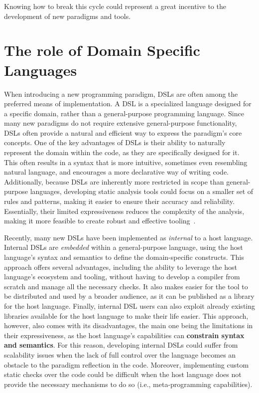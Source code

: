 \documentclass[12pt,a4paper,openright,twoside]{book}
\begin{document}
Knowing how to break this cycle could represent a great incentive to the
development of new paradigms and tools.

\section{The role of Domain Specific Languages} \label{sec:dsls}

When introducing a new programming paradigm, \acp{DSL} are often among the
preferred means of implementation. A \ac{DSL} is a specialized language designed
for a specific domain, rather than a general-purpose programming language. Since
many new paradigms do not require extensive general-purpose functionality,
\acp{DSL} often provide a natural and efficient way to express the paradigm’s
core concepts.
%
One of the key advantages of \acp{DSL} is their ability to naturally represent
the domain within the code, as they are specifically designed for it. This often
results in a syntax that is more intuitive, sometimes even resembling natural
language, and encourages a more declarative way of writing code. Additionally,
because \acp{DSL} are inherently more restricted in scope than general-purpose
languages, developing static analysis tools could focus on a smaller set of
rules and patterns, making it easier to ensure their accuracy and reliability.
Essentially, their limited expressiveness reduces the complexity of the
analysis, making it more feasible to create robust and effective
tooling~\cite{DBLP:journals/csur/MernikHS05}. 

Recently, many new \acp{DSL} have been implemented as \emph{internal} to a host
language. Internal \acp{DSL} are \emph{embedded} within a general-purpose
language, using the host language's syntax and semantics to define the
domain-specific constructs. This approach offers several advantages, including
the ability to leverage the host language's ecosystem and tooling, without
having to develop a compiler from scratch and manage all the necessary checks.
It also makes easier for the tool to be distributed and used by a broader
audience, as it can be published as a library for the host language.
%
Finally, internal \ac{DSL} users can also exploit already existing libraries
available for the host language to make their life easier. This approach,
however, also comes with its disadvantages, the main one being the limitations
in their expressiveness, as the host language's capabilities can
\textbf{constrain syntax and semantics}. For this reason, developing internal
\acp{DSL} could suffer from scalability issues when the lack of full control
over the language becomes an obstacle to the paradigm reflection in the code.
Moreover, implementing custom static checks over the code could be difficult
when the host language does not provide the necessary mechanisms to do so (i.e.,
meta-programming capabilities).
\end{document}
